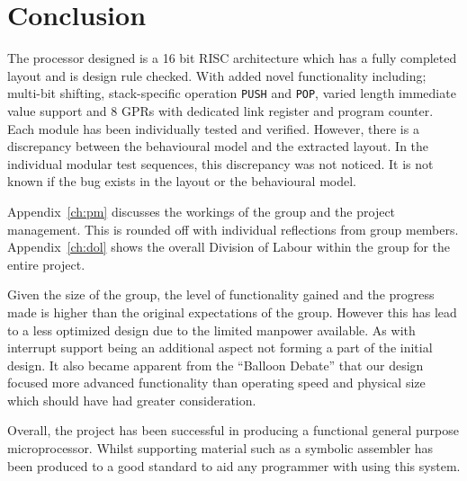

\chapter{Conclusion}

The processor designed is a 16 bit RISC architecture which has a fully completed layout and is design rule checked. 
With added novel functionality including; multi-bit shifting, stack-specific operation \texttt{PUSH} and \texttt{POP}, varied length immediate value support and 8 GPRs with dedicated link register and program counter. 
Each module has been individually tested and verified.
However, there is a discrepancy between the behavioural model and the extracted layout.
In the individual modular test sequences, this discrepancy was not noticed. 
It is not known if the bug exists in the layout or the behavioural model. 

Appendix~\ref{ch:pm} discusses the workings of the group and the project management.
This is rounded off with individual reflections from group members.
Appendix~\ref{ch:dol} shows the overall Division of Labour within the group for the entire project.

Given the size of the group, the level of functionality gained and the progress made is higher than the original expectations of the group. 
However this has lead to a less optimized design due to the limited manpower available. 
As with interrupt support being an additional aspect not forming a part of the initial design. 
It also became apparent from the ``Balloon Debate'' that our design focused more advanced functionality than operating speed and physical size which should have had greater consideration. 

Overall, the project has been successful in producing a functional general purpose microprocessor.  
Whilst supporting material such as a symbolic assembler has been produced to a good standard to aid any programmer with using this system. 